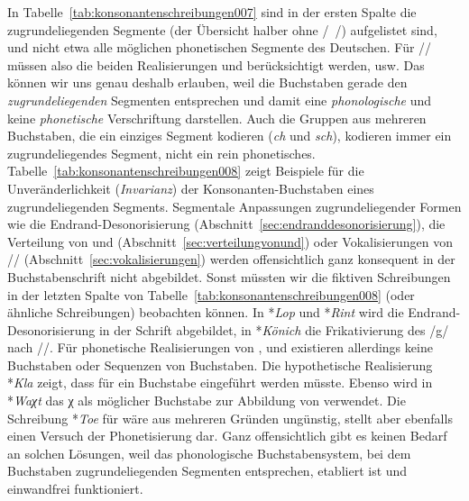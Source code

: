 In Tabelle~\ref{tab:konsonantenschreibungen007} sind in der ersten Spalte die zugrundeliegenden Segmente (der Übersicht halber ohne /~/) aufgelistet sind, und nicht etwa alle möglichen phonetischen Segmente des Deutschen.
Für // müssen also die beiden Realisierungen \textipa{[\c{c}]} und \textipa{[X]} berücksichtigt werden, usw.
Das können wir uns genau deshalb erlauben, weil die Buchstaben gerade den \textit{zugrundeliegenden} Segmenten entsprechen und damit eine \textit{phonologische} und keine \textit{phonetische} Verschriftung darstellen.
Auch die Gruppen aus mehreren Buchstaben, die ein einziges Segment kodieren (\zB \textit{ch} und \textit{sch}), kodieren immer ein zugrundeliegendes Segment, nicht ein rein phonetisches.
Tabelle~\ref{tab:konsonantenschreibungen008} zeigt Beispiele für die Unveränderlichkeit (\textit{Invarianz}) der Konsonanten-Buchstaben eines zugrundeliegenden Segments.
Segmentale Anpassungen zugrundeliegender Formen wie die Endrand-Desonorisierung (Abschnitt~\ref{sec:endranddesonorisierung}), die Verteilung von \textipa{[\c{c}]} und \textipa{[X]} (Abschnitt~\ref{sec:verteilungvonund}) oder Vokalisierungen von // (Abschnitt~\ref{sec:vokalisierungen}) werden offensichtlich ganz konsequent in der Buchstabenschrift nicht abgebildet.
Sonst müssten wir die fiktiven Schreibungen in der letzten Spalte von Tabelle~\ref{tab:konsonantenschreibungen008} (oder ähnliche Schreibungen) beobachten können.
In *\textit{Lop} und *\textit{Rint} wird die Endrand-Desonorisierung in der Schrift abgebildet, in *\textit{Könich} die Frikativierung des /g/ nach //.
Für phonetische Realisierungen von \textipa{[N]}, \textipa{[X]} und \textipa{[5]} existieren allerdings keine Buchstaben oder Sequenzen von Buchstaben.
Die hypothetische Realisierung *\textit{Kla} zeigt, dass für \textipa{[N]} ein Buchstabe eingeführt werden müsste.
Ebenso wird in *\textit{Waχt} das χ als möglicher Buchstabe zur Abbildung von \textipa{[X]} verwendet.
Die Schreibung *\textit{Toe} für \textipa{[t\t{o5}]} wäre aus mehreren Gründen ungünstig, stellt aber ebenfalls einen Versuch der Phonetisierung dar.
Ganz offensichtlich gibt es keinen Bedarf an solchen Lösungen, weil das phonologische Buchstabensystem, bei dem Buchstaben zugrundeliegenden Segmenten entsprechen, etabliert ist und einwandfrei funktioniert.

